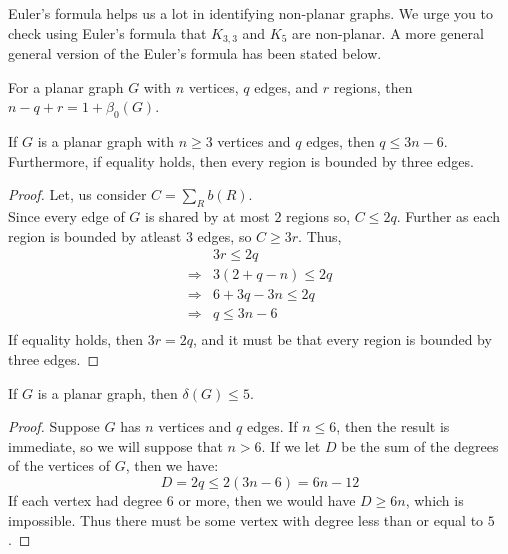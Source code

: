 \documentclass[../basic_graph_theory.tex]{subfiles}
\begin{document}
Euler's formula helps us a lot in identifying non-planar graphs. We urge you to check using Euler's formula that $K_{3,3}$ and $K_5$ are non-planar. A more general general version of the Euler's formula has been stated below.

\begin{Thm}{}{}
    For a planar graph $G$ with $n$ vertices, $q$ edges, and $r$ regions, then $n-q+r=1+\beta_{0}(G)$.
\end{Thm}{}{}

\begin{Thm}{}{}
    If $G$ is a planar graph with $n \ge 3$ vertices and $q$ edges, then $q \le 3n - 6$. Furthermore, if equality holds, then every region is bounded by three edges.
\end{Thm}{}{}
\begin{proof}
    Let, us consider $C=\sum_{R}b(R)$.\\
    Since every edge of $G$ is shared by at most $2$ regions so, $C \le 2q$. Further as each region is bounded by atleast $3$ edges, so $C \ge 3r$. Thus,\\
    \begin{align*}
        &3r \le 2q\\
        \Longrightarrow &3(2+q-n) \le 2q\\
        \Longrightarrow &6+3q-3n \le 2q\\
        \Longrightarrow &q \le 3n-6\\
    \end{align*}
    If equality holds, then $3r = 2q$, and it must be that every region is bounded by three edges.
\end{proof}

\begin{Thm}{}{}
    If $G$ is a planar graph, then $\delta(G) \le 5$.
\end{Thm}{}{}
\begin{proof}
    Suppose $G$ has $n$ vertices and $q$ edges. If $n \le 6$, then the result is immediate, so we will suppose that $n > 6$. If we let $D$ be the sum of the degrees of the vertices of $G$, then we have:\\
    \begin{equation*}
        D = 2q \le 2(3n - 6) = 6n - 12
    \end{equation*}
    If each vertex had degree $6$ or more, then we would have $D \ge 6n$, which is impossible. Thus there must be some vertex with degree less than or equal to $5$.
\end{proof}
\end{document}
